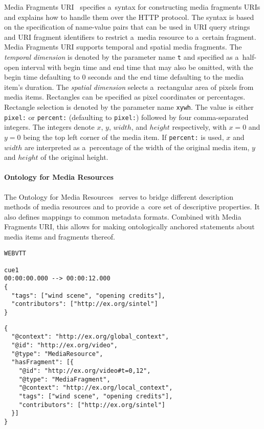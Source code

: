 \documentclass{sig-alternate}
\newcommand{\inlinelistingsize}{\fontsize{8pt}{11pt}}
\let\oldurl\url
\renewcommand{\url}[1]{\inlinelistingsize\oldurl{#1}}
\def\JSONLD{\mbox{JSON-LD}}
\begin{document}
Media Fragments URI~\cite{troncy2012mediafragments}
specifies a~syntax for constructing media fragments URIs
and explains how to handle them over the HTTP protocol.
The syntax is based on the specification of
name-value pairs that can be used in URI query strings
and URI fragment identifiers to restrict a~media resource
to a~certain fragment.
Media Fragments URI supports temporal and spatial media fragments.
The \emph{temporal dimension} is denoted
by the parameter name \texttt{t} and specified
as a~half-open interval with begin time and end time
that may also be omitted,
with the begin time defaulting to 0 seconds
and the end time defaulting to the media item's duration.
The \emph{spatial dimension} selects
a~rectangular area of pixels from media items.
Rectangles can be specified as pixel coordinates or percentages.
Rectangle selection is denoted by the parameter name \texttt{xywh}.
The value is either \texttt{pixel:} or \texttt{percent:}
(defaulting to \texttt{pixel:})
followed by four comma-separated integers.
The integers denote $x$, $y$, $width$, and $height$ respectively,
with $x = 0$ and $y = 0$ being the top left corner of the media item.
If \texttt{percent:} is used, $x$ and $width$ are interpreted
as a~percentage of the width of the original media item,
$y$ and $height$
of the original height.

\paragraph{Ontology for Media Resources}

The Ontology for Media Resources~\cite{lee2012mediaontology}
serves to bridge different description methods of media resources
and to provide a~core set of descriptive properties.
It also defines mappings to common metadata formats.
Combined with Media Fragments URI,
this allows for making ontologically anchored statements
about media items and fragments thereof.

\begin{lstlisting}[caption={Sample WebVTT metadata file},
  label=listing:webvtt, float=t!]
WEBVTT

cue1
00:00:00.000 --> 00:00:12.000
{
  "tags": ["wind scene", "opening credits"],
  "contributors": ["http://ex.org/sintel"]
}
\end{lstlisting}

\begin{lstlisting}[caption={Generated \JSONLD~for the Web of Data, see
    \url{http://bit.ly/webvtt-jsonld} for the RDF triples},
  label=listing:jsonld, float=t!]
{
  "@context": "http://ex.org/global_context",
  "@id": "http://ex.org/video",
  "@type": "MediaResource",
  "hasFragment": [{
    "@id": "http://ex.org/video#t=0,12",
    "@type": "MediaFragment",
    "@context": "http://ex.org/local_context",
    "tags": ["wind scene", "opening credits"],
    "contributors": ["http://ex.org/sintel"]
  }]
}
\end{lstlisting}
\end{document}
